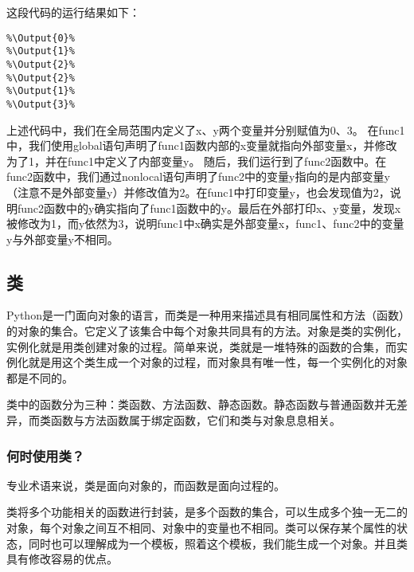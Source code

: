 \documentclass[../../Main.tex]{subfiles}
\begin{document}
这段代码的运行结果如下：
\begin{lstlisting}
%\Output{0}%
%\Output{1}%
%\Output{2}%
%\Output{2}%
%\Output{1}%
%\Output{3}%
\end{lstlisting}

上述代码中，我们在全局范围内定义了x、y两个变量并分别赋值为0、3。
在func1中，我们使用global语句声明了func1函数内部的x变量就指向外部变量x，并修改为了1，并在func1中定义了内部变量y。
随后，我们运行到了func2函数中。在func2函数中，我们通过nonlocal语句声明了func2中的变量y指向的是内部变量y（注意不是外部变量y）并修改值为2。在func1中打印变量y，也会发现值为2，说明func2函数中的y确实指向了func1函数中的y。最后在外部打印x、y变量，发现x被修改为1，而y依然为3，说明func1中x确实是外部变量x，func1、func2中的变量y与外部变量y不相同。

\subsection{类}
Python是一门面向对象的语言，而类是一种用来描述具有相同属性和方法（函数）的对象的集合。它定义了该集合中每个对象共同具有的方法。对象是类的实例化，实例化就是用类创建对象的过程。简单来说，类就是一堆特殊的函数的合集，而实例化就是用这个类生成一个对象的过程，而对象具有唯一性，每一个实例化的对象都是不同的。

类中的函数分为三种：类函数、方法函数、静态函数。静态函数与普通函数并无差异，而类函数与方法函数属于绑定函数，它们和类与对象息息相关。

\subsubsection{何时使用类？}
专业术语来说，类是面向对象的，而函数是面向过程的。

类将多个功能相关的函数进行封装，是多个函数的集合，可以生成多个独一无二的对象，每个对象之间互不相同、对象中的变量也不相同。类可以保存某个属性的状态，同时也可以理解成为一个模板，照着这个模板，我们能生成一个对象。并且类具有修改容易的优点。
\end{document}
